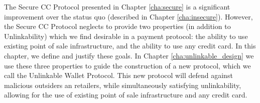 The Secure CC Protocol presented in Chapter \ref{cha:secure} is a significant improvement over the status quo (described in Chapter \ref{cha:insecure}).
However, the Secure CC Protocol neglects to provide two properties (in addition to Unlinkability) which we find desirable in a payment protocol:
  the ability to use existing point of sale infrastructure, and the ability to use any credit card.
In this chapter, we define and justify these goals.
In Chapter \ref{cha:unlinkable_design} we use these three properties to guide the construction of a new protocol, which we call the Unlinkable Wallet Protocol.
This new protocol will defend against malicious outsiders an retailers, while simultaneously satisfying unlinkability,
    allowing for the use of existing point of sale infrastructure and any credit card.
